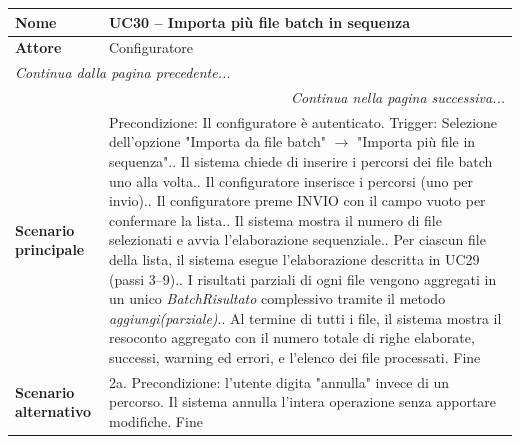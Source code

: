 \documentclass[12pt, a4paper, oneside]{report}
\begin{document}
\begin{tabularx}{\textwidth}{|l|X|}
    \hline
    \textbf{Nome} & \textbf{UC30 – Importa più file batch in sequenza} \\ \hline
    \textbf{Attore} & Configuratore \\ \hline
    \endfirsthead 

    \hline
    \multicolumn{2}{|l|}{\textit{Continua dalla pagina precedente...}} \\ \hline
    \endhead 

    \hline
    \multicolumn{2}{|r|}{\textit{Continua nella pagina successiva...}} \\ \hline
    \endfoot 

    \hline
    \endlastfoot

    \textbf{Scenario principale} & 
    Precondizione: Il configuratore è autenticato.\newline
    Trigger: Selezione dell'opzione "Importa da file batch" $\rightarrow$ "Importa più file in sequenza".\newline
    1. Il sistema chiede di inserire i percorsi dei file batch uno alla volta.\newline
    2. Il configuratore inserisce i percorsi (uno per invio).\newline
    3. Il configuratore preme INVIO con il campo vuoto per confermare la lista.\newline
    4. Il sistema mostra il numero di file selezionati e avvia l'elaborazione sequenziale.\newline
    5. Per ciascun file della lista, il sistema esegue l'elaborazione descritta in UC29 (passi 3–9).\newline
    6. I risultati parziali di ogni file vengono aggregati in un unico \textit{BatchRisultato} complessivo tramite il metodo \textit{aggiungi(parziale)}.\newline
    7. Al termine di tutti i file, il sistema mostra il resoconto aggregato con il numero totale di righe elaborate, successi, warning ed errori, e l'elenco dei file processati.\newline
    Fine \\ \hline
    
    \textbf{Scenario alternativo} & 
    2a. Precondizione: l'utente digita "annulla" invece di un percorso.\newline
    Il sistema annulla l'intera operazione senza apportare modifiche.\newline
    Fine \\ \hline


\end{tabularx}
\end{document}
